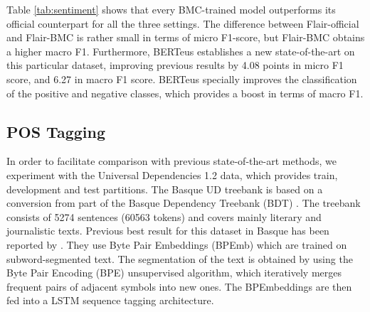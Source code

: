 \documentclass[10pt, a4paper]{article}
\begin{document}
Table \ref{tab:sentiment} shows that every BMC-trained model outperforms its official counterpart for all the three settings. The difference between Flair-official and Flair-BMC is rather small in terms of micro F1-score, but Flair-BMC obtains a higher macro F1. Furthermore, BERTeus establishes a new state-of-the-art on this particular dataset, improving previous results \cite{san2019multilingual} by 4.08 points in micro F1 score, and 6.27 in macro F1 score. BERTeus specially improves the classification of the positive and negative classes, which provides a boost in terms of macro F1.

\subsection{POS Tagging}\label{sec:pos-tagging}

In order to facilitate comparison with previous state-of-the-art methods, we experiment with the Universal Dependencies 1.2 data, which provides train, development and test partitions. The Basque UD treebank \cite{aranzabe2015automatic} is based on a conversion from part of the Basque Dependency Treebank (BDT) \cite{aduriz2003construction}. The treebank consists of 5274 sentences (60563 tokens) and covers mainly literary and journalistic texts. Previous best result for this dataset in Basque has been reported by \cite{heinzerling-strube-2019-sequence}. They use Byte Pair Embeddings (BPEmb) which are trained on subword-segmented text. The segmentation of the text is obtained by using the Byte Pair Encoding (BPE) unsupervised algorithm, which iteratively merges frequent pairs of adjacent symbols into new ones. The BPEmbeddings are then fed into a LSTM sequence tagging architecture.

\end{document}
